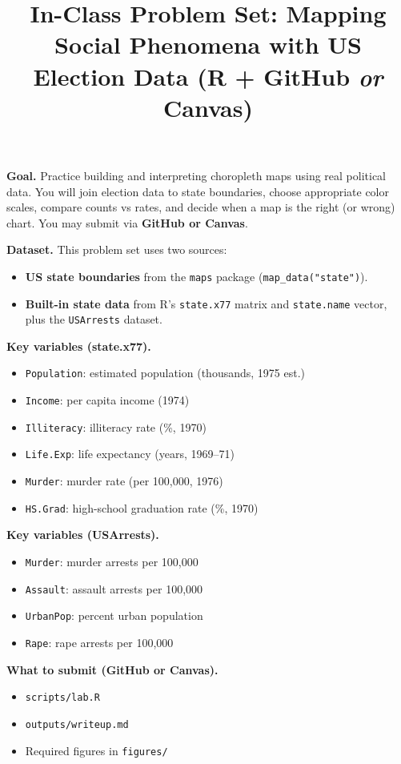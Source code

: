 \documentclass[11pt]{article}
\title{In-Class Problem Set: Mapping Social Phenomena with US Election Data (R + GitHub \emph{or} Canvas)}
\author{}
\date{}
\begin{document}
\maketitle

\noindent \textbf{Goal.} Practice building and interpreting choropleth maps using real political data. You will join election data to state boundaries, choose appropriate color scales, compare counts vs rates, and decide when a map is the right (or wrong) chart. You may submit via \textbf{GitHub or Canvas}.

\medskip
\noindent \textbf{Dataset.} This problem set uses two sources:
\begin{itemize}
  \item \textbf{US state boundaries} from the \texttt{maps} package (\texttt{map\_data("state")}).
  \item \textbf{Built-in state data} from R's \texttt{state.x77} matrix and \texttt{state.name} vector, plus the \texttt{USArrests} dataset.
\end{itemize}

\medskip
\noindent \textbf{Key variables (state.x77).}
\begin{itemize}
  \item \texttt{Population}: estimated population (thousands, 1975 est.)
  \item \texttt{Income}: per capita income (1974)
  \item \texttt{Illiteracy}: illiteracy rate (\%, 1970)
  \item \texttt{Life.Exp}: life expectancy (years, 1969--71)
  \item \texttt{Murder}: murder rate (per 100,000, 1976)
  \item \texttt{HS.Grad}: high-school graduation rate (\%, 1970)
\end{itemize}

\noindent \textbf{Key variables (USArrests).}
\begin{itemize}
  \item \texttt{Murder}: murder arrests per 100,000
  \item \texttt{Assault}: assault arrests per 100,000
  \item \texttt{UrbanPop}: percent urban population
  \item \texttt{Rape}: rape arrests per 100,000
\end{itemize}

\medskip
\noindent \textbf{What to submit (GitHub or Canvas).}
\begin{itemize}
  \item \texttt{scripts/lab.R}
  \item \texttt{outputs/writeup.md}
  \item Required figures in \texttt{figures/}
\end{itemize}
\end{document}
